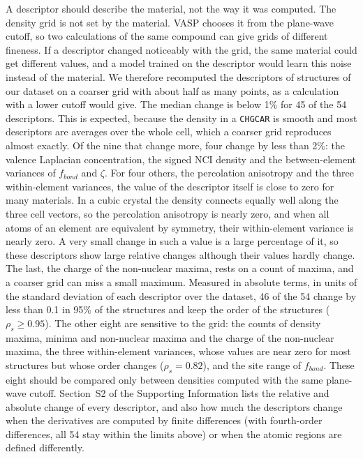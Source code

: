 \documentclass[journal=jctcce,manuscript=article,email=true]{achemso}
\newcommand{\rev}[1]{{\color{blue}#1}}
\begin{document}
A descriptor should describe the material, not the way it was computed. The
density grid is not set by the material. VASP chooses it from the plane-wave
cutoff, so two calculations of the same compound can give grids of different
fineness. If a descriptor changed noticeably with the grid, the same material
could get different values, and a model trained on the descriptor would learn
this noise instead of the material. We therefore recomputed the descriptors of
structures of our dataset on a coarser grid with about half as many points, as
a calculation with a lower cutoff would give. The median change is below 1\%
for \rev{45 of the 54} descriptors. This is expected, because the density in a
\texttt{CHGCAR} is smooth and most descriptors are averages over the whole
cell, which a coarser grid reproduces almost exactly. Of the nine that change
more, four change by less than 2\%\rev{: the valence Laplacian concentration, the
signed NCI density and the between-element variances of $f_{bond}$ and $\zeta$}. For four others, the percolation anisotropy
and the three within-element variances, the value of the descriptor itself is
close to zero for many materials. In a cubic crystal the density connects
equally well along the three cell vectors, so the percolation anisotropy is
nearly zero, and when all atoms of an element are equivalent by symmetry, their
within-element variance is nearly zero. A very small change in such a value is
a large percentage of it, so these descriptors show large relative changes
although their values hardly change. The last, \rev{the charge of the non-nuclear
maxima, rests on a count of maxima}, and a coarser grid can miss a small maximum.
\rev{Measured in absolute terms, in units of the standard deviation of each
descriptor over the dataset, 46 of the 54 change by less than 0.1 in 95\% of the
structures and keep the order of the structures ($\rho_s\geq0.95$). The other
eight are sensitive to the grid: the counts of density maxima, minima and
non-nuclear maxima and the charge of the non-nuclear maxima, the three
within-element variances, whose values are near zero for most structures but
whose order changes ($\rho_s=0.82$), and the site range of $f_{bond}$. These
eight should be compared only between densities computed with the same
plane-wave cutoff.}
Section~S2 of the Supporting Information lists the \rev{relative and absolute} change of every descriptor,
and also how much the descriptors change when the derivatives are computed by
finite differences \rev{(with fourth-order differences, all 54 stay within the limits above)} or when the atomic regions are defined differently.
\end{document}
